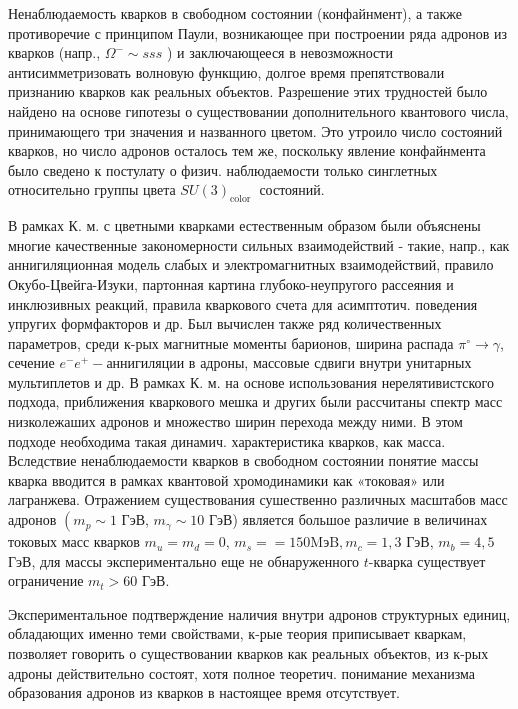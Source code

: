 \documentclass[10pt]{article}
\begin{document}
Ненаблюдаемость кварков в свободном состоянии (конфайнмент), а также противоречие с принципом Паули, возникающее при построении ряда адронов из кварков (напр., $\Omega^{-} \sim s s s$ ) и заключающееся в невозможности антисимметризовать волновую функщию, долгое время препятствовали признанию кварков как реальных объектов. Разрешение этих трудностей было найдено на основе гипотезы о существовании дополнительного квантового числа, принимающего три значения и названного цветом. Это утроило число состояний кварков, но число адронов осталось тем же, поскольку явление конфайнмента было сведено к постулату о физич. наблюдаемости только синглетных относительно группы цвета $S U(3)_{\text {color }}$ состояний.



В рамках К. м. с цветными кварками естественным образом были объяснены многие качественные закономерности сильных взаимодействий - такие, напр., как аннигиляционная модель слабых и электромагнитных взаимодействий, правило Окубо-Цвейга-Изуки, партонная картина глубоко-неупругого рассеяния и инклюзивных реакций, правила кваркового счета для асимптотич. поведения упругих формфакторов и др. Был вычислен также ряд количественных параметров, среди к-рых магнитные моменты барионов, ширина распада $\pi^{\circ} \rightarrow \gamma$, сечение $e^{-} e^{+}-$аннигиляции в адроны, массовые сдвиги внутри унитарных мультиплетов и др. В рамках К. м. на основе использования нерелятивистского подхода, приближения кваркового мешка и других были рассчитаны спектр масс низколежаших адронов и множество ширин перехода между ними. В этом подходе необходима такая динамич. характеристика кварков, как масса. Вследствие ненаблюдаемости кварков в свободном состоянии понятие массы кварка вводится в рамках квантовой хромодинамики как «токовая» или лагранжева. Отражением существования сушественно различных масштабов масс адронов $\left(m_{p} \sim 1\right.$ ГэВ, $m_{\gamma} \sim 10$ ГэВ) является большое различие в величинах токовых масс кварков $m_{u}=m_{d}=0$, $m_{s}==150 \mathrm{MэB}, m_{c}=1,3$ ГэВ, $m_{b}=4,5$ ГэВ, для массы экспериментально еще не обнаруженного $t$-кварка существует ограничение $m_{t}>60$ ГэВ.



Экспериментальное подтверждение наличия внутри адронов структурных единиц, обладающих именно теми свойствами, к-рые теория приписывает кваркам, позволяет говорить о существовании кварков как реальных объектов, из к-рых адроны действительно состоят, хотя полное теоретич. понимание механизма образования адронов из кварков в настоящее время отсутствует.
\end{document}
